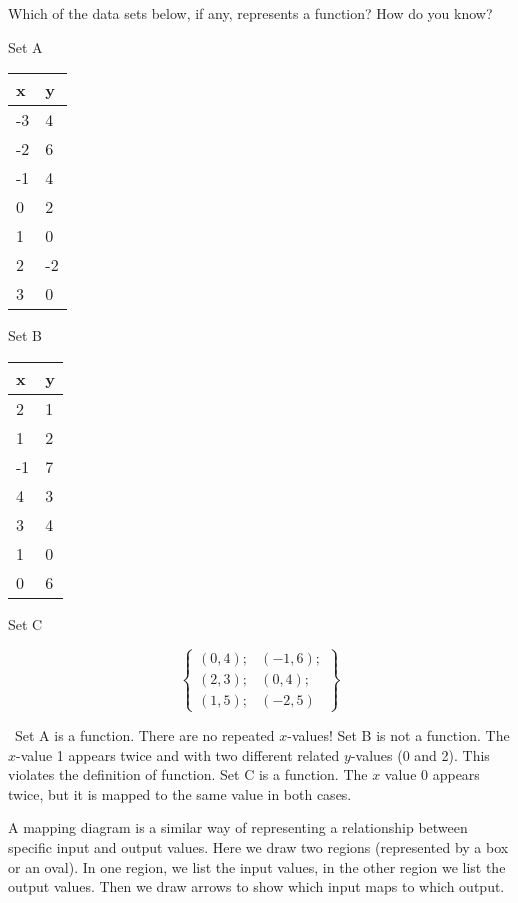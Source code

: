 \begin{boxex}
Which of the data sets below, if any, represents a function? How do you know?

\begin{minipage}[t]{0.33\textwidth}
\centering
Set A
\par\begin{tabular}{|C{1.5cm}|C{1.5cm}|}
\hline
x & y \\ & 4\\
-2 & 6\\
-1 & 4\\
0 & 2\\
1 & 0\\
2 & -2\\
3 & 0\\\hline
\end{tabular}
\end{minipage}
\begin{minipage}[t]{0.33\textwidth}
\centering
Set B
\par\begin{tabular}{|C{1.5cm}|C{1.5cm}|}
\hline
x & y \\ & 1\\
1 & 2\\
-1 & 7\\
4 & 3\\
3 & 4\\
1 & 0\\
0 & 6\\\hline
\end{tabular}
\end{minipage}
\begin{minipage}[t]{0.33\textwidth}
\centering
Set C
\par
\[\left\{\begin{array}{ll}
(0,4); &(-1,6);\\
(2,3); &(0,4);\\
(1,5); &(-2,5)
\end{array}\right\}\]
\end{minipage}

\exsoln\ Set A is a function. There are no repeated $x$-values! Set B is not a function. The $x$-value 1 appears twice and with two different related $y$-values (0 and 2). This violates the definition of function. Set C is a function. The $x$ value 0 appears twice, but it is mapped to the same value in both cases.
\end{boxex}

A \gls{mapping diagram} is a similar way of representing a relationship between specific input and output values. Here we draw two regions (represented by a box or an oval). In one region, we list the input values, in the other region we list the output values. Then we draw arrows to show which input maps to which output.

